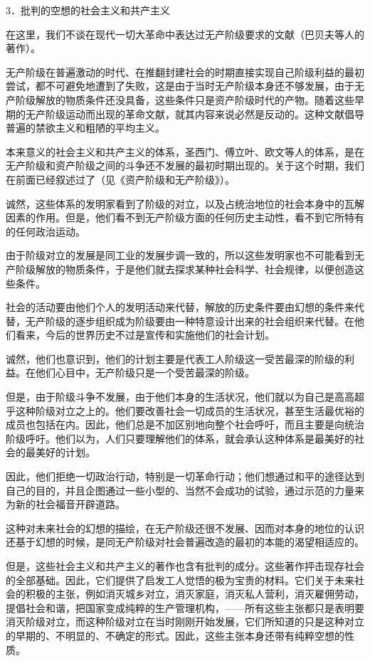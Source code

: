     3．批判的空想的社会主义和共产主义

    在这里，我们不谈在现代一切大革命中表达过无产阶级要求的文献（巴贝夫等人的著作）。

    无产阶级在普遍激动的时代、在推翻封建社会的时期直接实现自己阶级利益的最初尝试，都不可避免地遭到了失败，这是由于当时无产阶级本身还不够发展，由于无产阶级解放的物质条件还没具备，这些条件只是资产阶级时代的产物。随着这些早期的无产阶级运动而出现的革命文献，就其内容来说必然是反动的。这种文献倡导普遍的禁欲主义和粗陋的平均主义。

    本来意义的社会主义和共产主义的体系，圣西门、傅立叶、欧文等人的体系，是在无产阶级和资产阶级之间的斗争还不发展的最初时期出现的。关于这个时期，我们在前面已经叙述过了（见《资产阶级和无产阶级》）。

    诚然，这些体系的发明家看到了阶级的对立，以及占统治地位的社会本身中的瓦解因素的作用。但是，他们看不到无产阶级方面的任何历史主动性，看不到它所特有的任何政治运动。

    由于阶级对立的发展是同工业的发展步调一致的，所以这些发明家也不可能看到无产阶级解放的物质条件，于是他们就去探求某种社会科学、社会规律，以便创造这些条件。

    社会的活动要由他们个人的发明活动来代替，解放的历史条件要由幻想的条件来代替，无产阶级的逐步组织成为阶级要由一种特意设计出来的社会组织来代替。在他们看来，今后的世界历史不过是宣传和实施他们的社会计划。

    诚然，他们也意识到，他们的计划主要是代表工人阶级这一受苦最深的阶级的利益。在他们心目中，无产阶级只是一个受苦最深的阶级。

    但是，由于阶级斗争不发展，由于他们本身的生活状况，他们就以为自己是高高超乎这种阶级对立之上的。他们要改善社会一切成员的生活状况，甚至生活最优裕的成员也包括在内。因此，他们总是不加区别地向整个社会呼吁，而且主要是向统治阶级呼吁。他们以为，人们只要理解他们的体系，就会承认这种体系是最美好的社会的最美好的计划。

    因此，他们拒绝一切政治行动，特别是一切革命行动；他们想通过和平的途径达到自己的目的，并且企图通过一些小型的、当然不会成功的试验，通过示范的力量来为新的社会福音开辟道路。

    这种对未来社会的幻想的描绘，在无产阶级还很不发展、因而对本身的地位的认识还基于幻想的时候，是同无产阶级对社会普遍改造的最初的本能的渴望相适应的。

    但是，这些社会主义和共产主义的著作也含有批判的成分。这些著作抨击现存社会的全部基础。因此，它们提供了启发工人觉悟的极为宝贵的材料。它们关于未来社会的积极的主张，例如消灭城乡对立，消灭家庭，消灭私人营利，消灭雇佣劳动，提倡社会和谐，把国家变成纯粹的生产管理机构，——所有这些主张都只是表明要消灭阶级对立，而这种阶级对立在当时刚刚开始发展，它们所知道的只是这种对立的早期的、不明显的、不确定的形式。因此，这些主张本身还带有纯粹空想的性质。

